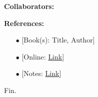 \documentclass[11pt]{article}
\begin{document}
\newpage  %

\begin{center}
\textbf{Collaborators:}
\end{center}
\vfill 

\begin{center}
\textbf{References:}
\end{center}
\begin{itemize}
\item[$\bullet$] [Book(s): Title, Author]
\item[$\bullet$] [Online: \href{http://example.com/}{\color{blue}Link}]
\item[$\bullet$] [Notes: \href{http://example.com/}{\color{blue}Link}]
\end{itemize}

\vfill
\begin{center}
Fin.
\end{center}
\vfill
\end{document}
